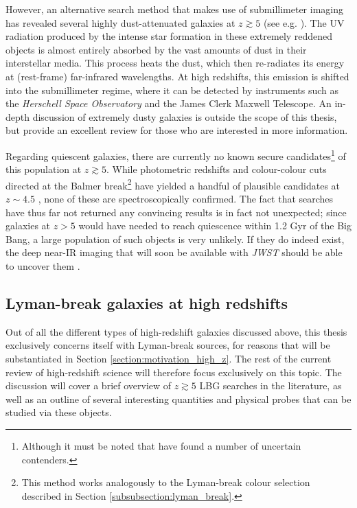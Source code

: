 However, an alternative search method that makes use of submillimeter imaging has revealed several highly dust-attenuated galaxies at $z\gtrsim5$ (see e.g. \citealt{2010ApJ...720L.131R,2012Natur.486..233W}). The UV radiation produced by the intense star formation in these extremely reddened objects is almost entirely absorbed by the vast amounts of dust in their interstellar media. This process heats the dust, which then re-radiates its energy at (rest-frame) far-infrared wavelengths. At high redshifts, this emission is shifted into the submillimeter regime, where it can be detected by instruments such as the \textit{Herschell Space Observatory} and the James Clerk Maxwell Telescope.  An in-depth discussion of extremely dusty galaxies is outside the scope of this thesis, but  \cite{2014PhR...541...45C} provide an excellent review for those who are interested in more information. \par 

Regarding quiescent galaxies, there are currently no known secure candidates\footnote{Although it must be noted that \cite{2016PASJ...68...46M} have found a number of uncertain contenders.} of this population at $z\gtrsim5$. While photometric redshifts and colour-colour cuts directed at the Balmer break\footnote{This method works analogously to the Lyman-break colour selection described in Section \ref{subsubsection:lyman_break}.} have yielded a handful of plausible candidates at $z\sim4.5$ \citep{2014ApJ...794...68N,2018MNRAS.473.2098M}, none of these are spectroscopically confirmed. The fact that searches have thus far not returned any convincing results is in fact not unexpected; since galaxies at $z>5$ would have needed to reach quiescence within 1.2 Gyr of the Big Bang, a large population of such objects is very unlikely. If they do indeed exist, the deep near-IR imaging that will soon be available with \textit{JWST} should be able to uncover them \citep{2016PASA...33...37F,2016PASJ...68...46M}. \par




\subsection{Lyman-break galaxies at high redshifts}
Out of all the different types of high-redshift galaxies discussed above, this thesis exclusively concerns itself with Lyman-break sources, for reasons that will be substantiated in Section \ref{section:motivation_high_z}. The rest of the current review of high-redshift science will therefore focus exclusively on this topic. The discussion will cover a brief overview of $z\gtrsim5$ LBG searches in the literature, as well as an outline of several interesting quantities and physical probes that can be studied via these objects. \par 

